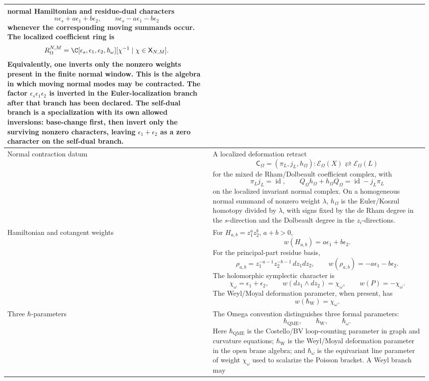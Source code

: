 \begin{longtable}{@{}>{\raggedright\arraybackslash}p{}
  >{\raggedright\arraybackslash}p{}@{}}
normal Hamiltonian and residue-dual characters
\[
  n\epsilon_s+a\epsilon_1+b\epsilon_2,\qquad
  n\epsilon_s-a\epsilon_1-b\epsilon_2
\]
whenever the corresponding moving summands occur.  The localized
coefficient ring is
\[
  R_\Omega^{N,M}
  =
  \C[\epsilon_s,\epsilon_1,\epsilon_2,\hbar_\omega]
  [\chi^{-1}\mid \chi\in\mathsf X_{N,M}].
\]
Equivalently, one inverts only the nonzero weights present in the finite
normal window.  This is the algebra in which moving normal
modes may be contracted.  The factor
\(\epsilon_s\epsilon_1\epsilon_2\) is inverted in the Euler-localization
branch after that branch has been declared.  The self-dual branch is a
specialization with its own allowed inversions: base-change first, then
invert only the surviving nonzero characters, leaving
\(\epsilon_1+\epsilon_2\) as a zero character on the self-dual branch.\\
\hline
Normal contraction datum &
A localized deformation retract
\[
  \mathsf C_\Omega=(\pi_L,j_L,h_\Omega)
  \colon
  \mathcal E_\Omega(X)
  \rightleftarrows
  \mathcal E_\Omega(L)
\]
for the mixed de Rham/Dolbeault coefficient complex, with
\[
  \pi_Lj_L=\operatorname{id},
  \qquad
  Q_\Omega h_\Omega+h_\Omega Q_\Omega
  =\operatorname{id}-j_L\pi_L
\]
on the localized invariant normal complex.  On a homogeneous normal summand of nonzero weight \(\lambda\),
\(h_\Omega\) is the Euler/Koszul homotopy divided by \(\lambda\), with
signs fixed by the de Rham degree in the \(s\)-direction and the
Dolbeault degree in the \(z_i\)-directions.\\
\hline
Hamiltonian and cotangent weights &
For \(H_{a,b}=z_1^az_2^b\), \(a+b>0\),
\[
  w(H_{a,b})=a\epsilon_1+b\epsilon_2.
\]
For the principal-part residue basis,
\[
  \rho_{a,b}=z_1^{-a-1}z_2^{-b-1}\,dz_1dz_2,
  \qquad
  w(\rho_{a,b})=-a\epsilon_1-b\epsilon_2 .
\]
The holomorphic symplectic character is
\[
  \chi_\omega=\epsilon_1+\epsilon_2,
  \qquad
  w(dz_1\wedge dz_2)=\chi_\omega,
  \qquad
  w(P)=-\chi_\omega .
\]
The Weyl/Moyal deformation parameter, when present, has
\[
  w(\hbar_{\mathrm{W}})=\chi_\omega.
\]\\
\hline
Three \(\hbar\)-parameters &
The Omega convention distinguishes three formal parameters:
\[
  \hbar_{\mathrm{QME}},\qquad
  \hbar_{\mathrm{W}},\qquad
  \hbar_\omega .
\]
Here \(\hbar_{\mathrm{QME}}\) is the Costello/BV loop-counting parameter
in graph and curvature equations; \(\hbar_{\mathrm{W}}\) is the
Weyl/Moyal deformation parameter in the open brane algebra; and
	\(\hbar_\omega\) is the equivariant line parameter of weight
	\(\chi_\omega\) used to scalarize the Poisson bracket.  A Weyl branch may

\end{longtable}
